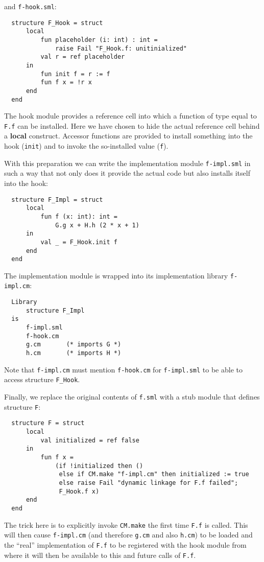 \documentclass[titlepage,letterpaper]{article}
\begin{document}
and {\tt f-hook.sml}:

\begin{verbatim}
  structure F_Hook = struct
      local
          fun placeholder (i: int) : int =
              raise Fail "F_Hook.f: unitinialized"
          val r = ref placeholder
      in
          fun init f = r := f
          fun f x = !r x
      end
  end
\end{verbatim}

The hook module provides a reference cell into which a function of
type equal to {\tt F.f} can be installed.  Here we have chosen to hide
the actual reference cell behind a {\bf local} construct.  Accessor
functions are provided to install something into the hook
({\tt init}) and to invoke the so-installed value ({\tt f}).

With this preparation we can write the implementation module {\tt f-impl.sml}
in such a way that not only does it provide the actual
code but also installs itself into the hook:
\begin{verbatim}
  structure F_Impl = struct
      local
          fun f (x: int): int =
              G.g x + H.h (2 * x + 1)
      in
          val _ = F_Hook.init f
      end
  end
\end{verbatim}
\noindent The implementation module is wrapped into its implementation
library {\tt f-impl.cm}:
\begin{verbatim}
  Library
      structure F_Impl
  is
      f-impl.sml
      f-hook.cm
      g.cm       (* imports G *)
      h.cm       (* imports H *)
\end{verbatim}
\noindent Note that {\tt f-impl.cm} must mention {\tt f-hook.cm} for
{\tt f-impl.sml} to be able to access structure {\tt F\_Hook}.

Finally, we replace the original contents of {\tt f.sml} with a stub
module that defines structure {\tt F}:
\begin{verbatim}
  structure F = struct
      local
          val initialized = ref false
      in
          fun f x =
              (if !initialized then ()
               else if CM.make "f-impl.cm" then initialized := true
               else raise Fail "dynamic linkage for F.f failed";
               F_Hook.f x)
      end
  end
\end{verbatim}
\noindent The trick here is to explicitly invoke {\tt CM.make} the
first time {\tt F.f} is called.  This will then cause {\tt f-impl.cm}
(and therefore {\tt g.cm} and also {\tt h.cm}) to be loaded and the
``real'' implementation of {\tt F.f} to be registered with the hook
module from where it will then be available to this and future calls
of {\tt F.f}.
\end{document}
